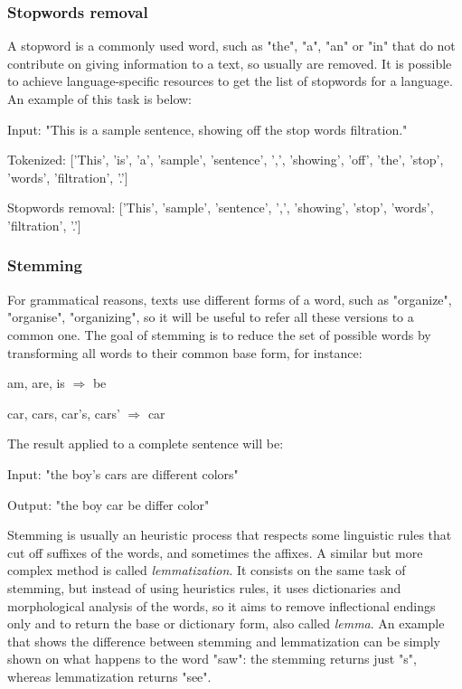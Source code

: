 \subsubsection{Stopwords removal}
A stopword is a commonly used word, such as "the", "a", "an" or "in" that do not contribute on giving information to a text, so usually are removed. It is possible to achieve language-specific resources to get the list of stopwords for a language. An example of this task is below:
\begin{description}
	\item Input: "This is a sample sentence, showing off the stop words filtration."
	\item Tokenized: ['This', 'is', 'a', 'sample', 'sentence', ',', 'showing', 'off', 'the', 'stop', 'words', 'filtration', '.']
	\item Stopwords removal: ['This', 'sample', 'sentence', ',', 'showing', 'stop', 'words', 'filtration', '.']
\end{description}


\subsubsection{Stemming}
For grammatical reasons, texts use different forms of a word, such as "organize", "organise", "organizing", so it will be useful to refer all these versions to a common one. The goal of stemming is to reduce the set of possible words by transforming all words to their common base form, for instance:
\begin{description}
	\item am, are, is $\Rightarrow$ be
	\item car, cars, car's, cars' $\Rightarrow$ car
\end{description}
The result applied to a complete sentence will be:
\begin{description}
	\item Input: "the boy's cars are different colors"
	\item Output: "the boy car be differ color"
\end{description}
Stemming is usually an heuristic process that respects some linguistic rules that cut off suffixes of the words, and sometimes the affixes. A similar but more complex method is called \textit{lemmatization}. It consists on the same task of stemming, but instead of using heuristics rules, it uses dictionaries and morphological analysis of the words, so it aims to remove inflectional endings only and to return the base or dictionary form, also called \textit{lemma}. An example that shows the difference between stemming and lemmatization can be simply shown on what happens to the word "saw": the stemming returns just "s", whereas lemmatization returns "see".


